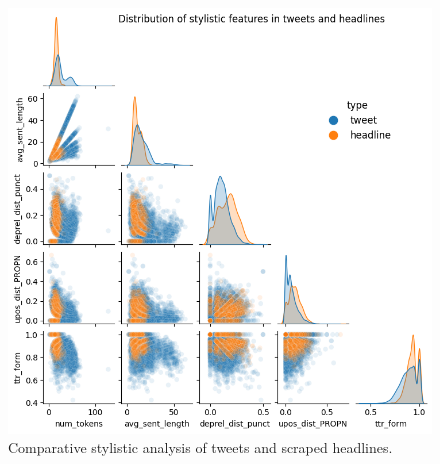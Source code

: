\begin{figure}
    \includegraphics[width=\columnwidth]{../../results/images/style.png}
    \caption{Comparat{}ive stylistic analysis of tweets and scraped headlines.}
    \label{fig:style}
\end{figure}
